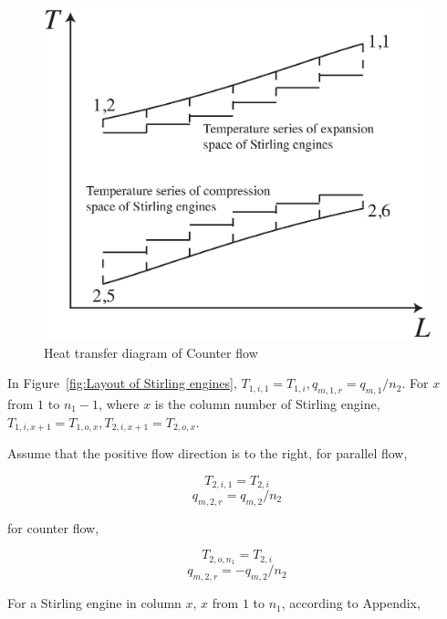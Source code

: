 \documentclass{article}
\begin{document}
\noindent \begin{figure}[htbp]
\begin{center}
	\includegraphics[width = 0.7\columnwidth]{./graphics/HeatTransfer_Counter}
	\caption{Heat transfer diagram of Counter flow}
	\label{fig:CounterFlow}
\end{center}
\end{figure}

In Figure~\ref{fig:Layout of Stirling engines}, $T_{1,i,1}=T_{1,i},q_{m,1,r}=q_{m,1}/n_{2}$. For $x$ from $1$ to $n_{1}-1$, where $x$ is the column number of Stirling engine, $T_{1,i,x+1}=T_{1,o,x},T_{2,i,x+1}=T_{2,o,x}$.

Assume that the positive flow direction is to the right, for parallel flow,

\begin{equation*}
	T_{2,i,1}=T_{2,i}\label{eq:T_2_i_1}
\end{equation*}
\begin{equation*}
	q_{m,2,r}=q_{m,2}/n_{2}
\end{equation*}

for counter flow,

\begin{equation*}
	T_{2,o,n_{1}}=T_{2,i}\label{eq:T_2_o_n1}
\end{equation*}
\begin{equation*}
	q_{m,2,r}=-q_{m,2}/n_{2}
\end{equation*}

For a Stirling engine in column $x$, $x$ from $1$ to $n_{1}$, according to Appendix,  
\end{document}
